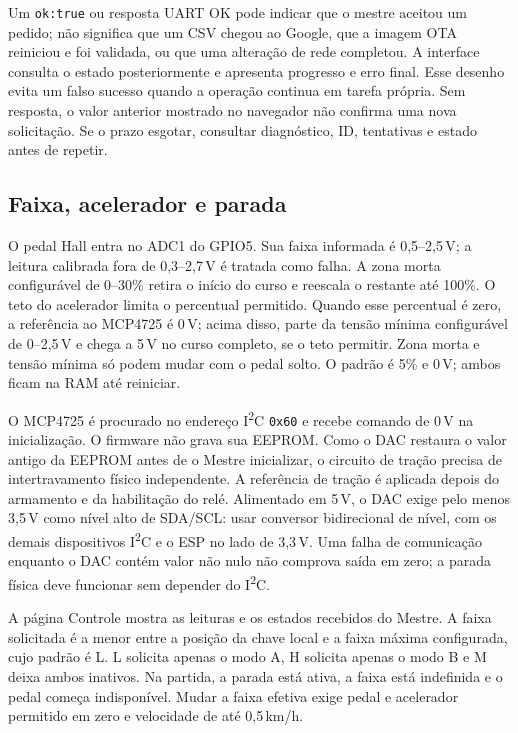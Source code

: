 Um \texttt{ok:true} ou resposta UART OK pode indicar que o mestre aceitou um pedido; não significa que um CSV chegou ao Google, que a imagem OTA reiniciou e foi validada, ou que uma alteração de rede completou. A interface consulta o estado posteriormente e apresenta progresso e erro final. Esse desenho evita um falso sucesso quando a operação continua em tarefa própria. Sem resposta, o valor anterior mostrado no navegador não confirma uma nova solicitação. Se o prazo esgotar, consultar diagnóstico, ID, tentativas e estado antes de repetir.

\subsection{Faixa, acelerador e parada}
O pedal Hall entra no ADC1 do GPIO5. Sua faixa informada é 0,5--2,5\,V; a leitura calibrada fora de 0,3--2,7\,V é tratada como falha. A zona morta configurável de 0--30\% retira o início do curso e reescala o restante até 100\%. O teto do acelerador limita o percentual permitido. Quando esse percentual é zero, a referência ao MCP4725 é 0\,V; acima disso, parte da tensão mínima configurável de 0--2,5\,V e chega a 5\,V no curso completo, se o teto permitir. Zona morta e tensão mínima só podem mudar com o pedal solto. O padrão é 5\% e 0\,V; ambos ficam na RAM até reiniciar.

O MCP4725 é procurado no endereço I\textsuperscript{2}C \texttt{0x60} e recebe comando de 0\,V na inicialização. O firmware não grava sua EEPROM. Como o DAC restaura o valor antigo da EEPROM antes de o Mestre inicializar, o circuito de tração precisa de intertravamento físico independente. A referência de tração é aplicada depois do armamento e da habilitação do relé. Alimentado em 5\,V, o DAC exige pelo menos 3,5\,V como nível alto de SDA/SCL: usar conversor bidirecional de nível, com os demais dispositivos I\textsuperscript{2}C e o ESP no lado de 3,3\,V. Uma falha de comunicação enquanto o DAC contém valor não nulo não comprova saída em zero; a parada física deve funcionar sem depender do I\textsuperscript{2}C.

A página Controle mostra as leituras e os estados recebidos do Mestre. A faixa solicitada é a menor entre a posição da chave local e a faixa máxima configurada, cujo padrão é L. L solicita apenas o modo A, H solicita apenas o modo B e M deixa ambos inativos. Na partida, a parada está ativa, a faixa está indefinida e o pedal começa indisponível. Mudar a faixa efetiva exige pedal e acelerador permitido em zero e velocidade de até 0,5\,km/h.

